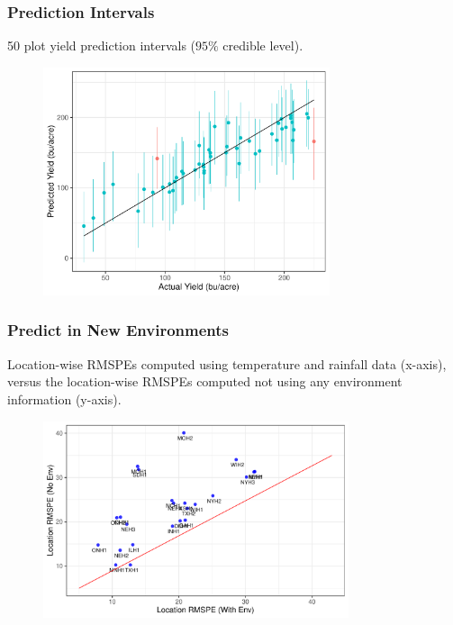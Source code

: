 \documentclass{beamer}
\begin{document}
\begin{frame}
	\frametitle{Prediction Intervals}
	50 plot yield prediction intervals ($95\%$ credible level).
	\begin{figure}[H]
		\centering
		\includegraphics[width = 0.75\textwidth]{true_vs_predint.pdf}
	\end{figure}
\end{frame}




\begin{frame}
	\frametitle{Predict in New Environments}
	Location-wise RMSPEs computed using temperature and rainfall data (x-axis), versus the location-wise RMSPEs computed not using any environment information (y-axis). 
	\begin{figure}[H]
		\centering
		\includegraphics[width = 0.8\textwidth]{type3pred1.pdf}
	\end{figure}
	
\end{frame}
\end{document}
